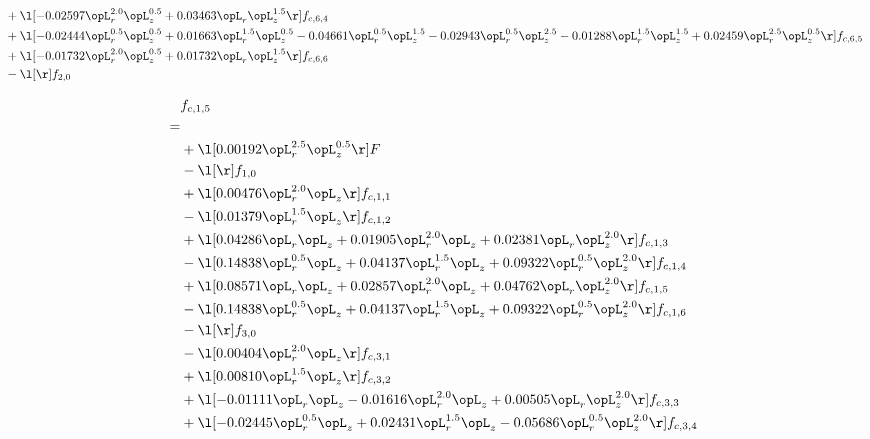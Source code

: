 \begin{alignat}{2}
& + \l[  -0.02597 \opL_r^{2.0} \opL_z^{0.5} +  0.03463 \opL_r \opL_z^{1.5}  \r] f_{c,6,4} \nonumber \\ 
& + \l[  -0.02444 \opL_r^{0.5} \opL_z^{0.5} +  0.01663 \opL_r^{1.5} \opL_z^{0.5}   -0.04661 \opL_r^{0.5} \opL_z^{1.5}   -0.02943 \opL_r^{0.5} \opL_z^{2.5}   -0.01288 \opL_r^{1.5} \opL_z^{1.5} +  0.02459 \opL_r^{2.5} \opL_z^{0.5}  \r] f_{c,6,5} \nonumber \\ 
& + \l[  -0.01732 \opL_r^{2.0} \opL_z^{0.5} +  0.01732 \opL_r \opL_z^{1.5}  \r] f_{c,6,6} \nonumber \\ 
& - \l[  \r] f_{2,0} \nonumber \\ 
\end{alignat} 


\begin{alignat}{2} 
\label{eq:f_15_1} 
& f_{c,1,5} \nonumber \\ 
 = \\ 
& + \l[  0.00192 \opL_r^{2.5} \opL_z^{0.5}  \r] F \nonumber \\ 
& - \l[  \r] f_{1,0} \nonumber \\ 
& + \l[  0.00476 \opL_r^{2.0} \opL_z  \r] f_{c,1,1} \nonumber \\ 
& - \l[  0.01379 \opL_r^{1.5} \opL_z  \r] f_{c,1,2} \nonumber \\ 
& + \l[  0.04286 \opL_r \opL_z +  0.01905 \opL_r^{2.0} \opL_z +  0.02381 \opL_r \opL_z^{2.0}  \r] f_{c,1,3} \nonumber \\ 
& - \l[  0.14838 \opL_r^{0.5} \opL_z +  0.04137 \opL_r^{1.5} \opL_z +  0.09322 \opL_r^{0.5} \opL_z^{2.0}  \r] f_{c,1,4} \nonumber \\ 
& + \l[  0.08571 \opL_r \opL_z +  0.02857 \opL_r^{2.0} \opL_z +  0.04762 \opL_r \opL_z^{2.0}  \r] f_{c,1,5} \nonumber \\ 
& - \l[  0.14838 \opL_r^{0.5} \opL_z +  0.04137 \opL_r^{1.5} \opL_z +  0.09322 \opL_r^{0.5} \opL_z^{2.0}  \r] f_{c,1,6} \nonumber \\ 
& - \l[  \r] f_{3,0} \nonumber \\ 
& - \l[  0.00404 \opL_r^{2.0} \opL_z  \r] f_{c,3,1} \nonumber \\ 
& + \l[  0.00810 \opL_r^{1.5} \opL_z  \r] f_{c,3,2} \nonumber \\ 
& + \l[  -0.01111 \opL_r \opL_z   -0.01616 \opL_r^{2.0} \opL_z +  0.00505 \opL_r \opL_z^{2.0}  \r] f_{c,3,3} \nonumber \\ 
& + \l[  -0.02445 \opL_r^{0.5} \opL_z +  0.02431 \opL_r^{1.5} \opL_z   -0.05686 \opL_r^{0.5} \opL_z^{2.0}  \r] f_{c,3,4} \nonumber \\ 

\end{alignat}
